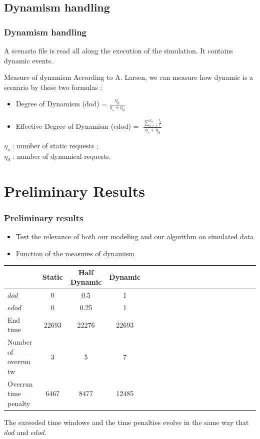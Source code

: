 \documentclass{beamer}
\begin{document}
\subsection*{Dynamism handling}
\begin{frame}

 \frametitle{Dynamism handling}
A scenario file is read all along the execution of the simulation. It contains dynamic events.

\begin{block}{Measure of dynamism}
According to A. Larsen\cite{Larsen00}, we can measure how dynamic is a scenario by these two formulas : 
  \begin{itemize}
  \item Degree of Dynamism (dod) = $\frac{\eta_d}{\eta_s+\eta_d}$
  \item Effective Degree of Dynamism (edod) = $\; \frac{\sum_{i=1}^{\eta_d}\frac{t_i}{T}}{\eta_s+\eta_d}$
\end{itemize}

$\eta_s$ : number of static requests ; \\
$\eta_d$ : number of dynamical requests.

\end{block}
\end{frame}


\section{Preliminary Results}
\begin{frame}
\frametitle{Preliminary results}
\begin{itemize}
 \item Test the relevance of both our modeling and our algorithm on simulated data
 \item Function of the measures of dynamism
\end{itemize}

\begin{center}
	\begin{tabular}{*{5}{|l|c|c|c}}
		\hline
						& Static& Half Dynamic & Dynamic \\
		\hline
		$dod$				& 0 	&0.5 	& 1 	 \\
		$edod$				& 0 	&0.25	& 1 	\\
		\hline
		End time 			&22693	& 22276	& 22693   \\
		\hline		
		Number of overrun tw		&3	&5 	& 7 \\
		\hline		
		Overrun time penalty		&6467	&8477	& 12485\\
		\hline
	
	\end{tabular}
\end{center}

The exceeded time windows and the time penalties evolve in the same way that $dod$ and $edod$.

\end{frame}
\end{document}
